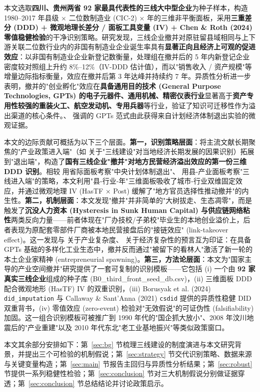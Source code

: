 本文选取\textbf{四川、贵州两省 92 家最具代表性的三线大中型企业}为种子样本，构造 1980--2017 年县级 × 二位数制造业 (CIC-2) × 年的三维非平衡面板，采用\textbf{三重差分 (DDD) + 微观地理长差分 / 面板工具变量 (IV) + Chen \& Roth (2024) 零值稳健检验}的干净识别策略。研究发现，三线企业撤并对原驻留县域相同与上下游关联二位数行业内的非国有制造业企业诞生率具有\textbf{显著正向且经济上可观的促进效应}：以非国有制造业企业新登记数衡量，处理组在撤并后的 5 年内新登记企业密度较对照组上升约 8\%--12\%（IV-DDD 估计值），而以"销售收入 / 资产规模"等增量边际指标衡量，效应在撤并后第 3 年达峰并持续约 7 年。异质性分析进一步表明，撤并的"创业孵化"效应在\textbf{具备通用目的技术 (General Purpose Technologies, GPTs) 的电子元器件、通用机械、精密仪表行业}显著高于\textbf{资产专用性较强的重装火工、航空发动机、专用兵器}等行业，验证了知识可迁移性作为溢出渠道的核心条件。\citet{bresnahan1995}、\citet{helpman1998} 强调的 GPTs 范式由此获得来自计划经济体制退出实验的微观证据。

本文的边际贡献可概括为以下三个层面。\textbf{第一，识别策略层面}：将主流文献长期聚焦的"产业政策进入端"（如 \citet{FanZou2021} 关于"三线建设"对当地经济长期发展的因果识别）拓展到"退出端"，构造了\textbf{国有三线企业"撤并"对地方民营经济溢出效应的第一份三维 DDD 识别}。相较 \citet{徐现祥2017} 用省际面板考察"中央计划体制退出"、\citet{刘冲2020} 用县-产业面板考察"三线进入端"的策略，本文利用"县-行业-年"三维面板吸收了城市-行业双维固定效应，并通过微观地理 IV (HasTF × Post) 缓解了"地方官员选择性推动撤并"的内生性。\textbf{第二，机制层面}：本文发现"撤并"并非简单的"大树拔走、生态凋零"，而是触发了\textbf{沉没人力资本 (Hysteresis in Sunk Human Capital) 与供应链网络粘性}两类反向力量——前者体现在"厂办技校/子弟校"毕业生的本地创业溢价上，后者表现为原配套零部件厂商被本地民营接盘后的"接链效应" (link-takeover effect)。这一发现与 \citet{hausmann2003} 关于产业复杂度、\citet{hidalgo2009} 关于经济复杂性的预言互为印证：在具备 GPTs 基础的多样化工业生态中，撤并反而通过"被留下的看林人"激活了新一轮的本土企业家精神 (entrepreneurial spawning)。\textbf{第三，方法论层面}：本文为"国家主导的产业空间撤并"研究提供了一套可复制的识别模板——它包括 (i) 一个由 \textbf{92 家真实三线企业}组成的种子库 (B0\_third\_front\_seed\_db.csv)，(ii) 三维面板 DDD 配合微观地形 (HasTF) IV 的双重识别，(iii) Borusyak et al. (2024) \texttt{did\_imputation} 与 Callaway \& Sant'Anna (2021) \texttt{csdid} 提供的异质性稳健 DID 双重背书，(iv) \citet{chen2024} 零值效应 (zero-event) 检验对"无效假说"的可证伪性 (falsifiability) 加固。这一组合识别模板可被推广到 1990 年代的"国企抓大放小"、2008 年汶川地震后的"产业重建"以及 2010 年代东北"老工业基地振兴"等类似政策窗口。

本文其余部分安排如下：第~\ref{sec:bg} 节梳理三线建设的制度演进与本文研究背景，并提出三个可检验的机制假说；第~\ref{sec:strategy} 节交代识别策略、数据来源与关键变量构造；第~\ref{sec:main} 节报告主回归与异质性分析结果；第~\ref{sec:robust} 节提供一系列稳健性检验；第~\ref{sec:conclusion} 节对三大机制假说分别做证据穿透；第~\ref{sec:conclusion} 节总结结论并讨论政策启示。
